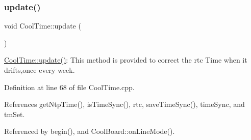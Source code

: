 \subsubsection{\texorpdfstring{update()}{update()}}
{\footnotesize\ttfamily void Cool\+Time\+::update (\begin{DoxyParamCaption}{ }\end{DoxyParamCaption})}

\hyperlink{classCoolTime_aae601f795452cfa48d9fb337aed483a8}{Cool\+Time\+::update()}\+: This method is provided to correct the rtc Time when it drifts,once every week. 

Definition at line 68 of file Cool\+Time.\+cpp.



References get\+Ntp\+Time(), is\+Time\+Sync(), rtc, save\+Time\+Sync(), time\+Sync, and tm\+Set.



Referenced by begin(), and Cool\+Board\+::on\+Line\+Mode().


